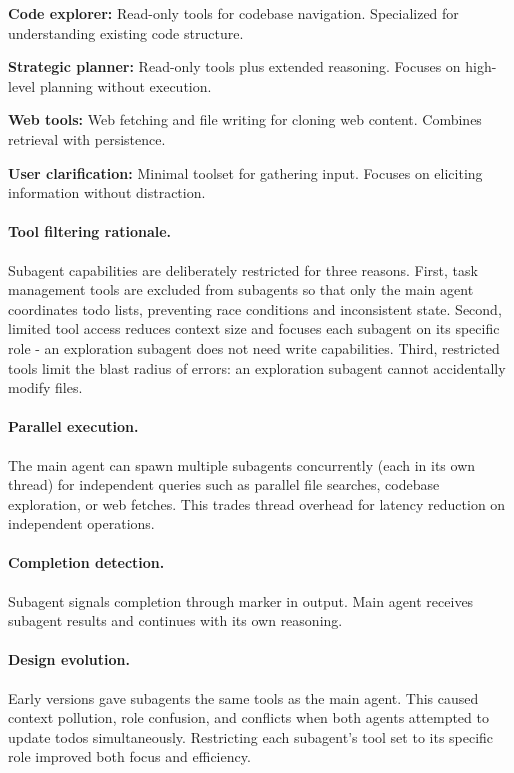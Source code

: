 \begin{packeditemize}
\item \textbf{Code explorer:} Read-only tools for codebase navigation. Specialized for understanding existing code structure.
\item \textbf{Strategic planner:} Read-only tools plus extended reasoning. Focuses on high-level planning without execution.
\item \textbf{Web tools:} Web fetching and file writing for cloning web content. Combines retrieval with persistence.
\item \textbf{User clarification:} Minimal toolset for gathering input. Focuses on eliciting information without distraction.
\end{packeditemize}

\paragraph{Tool filtering rationale.} Subagent capabilities are deliberately restricted for three reasons. First, task management tools are excluded from subagents so that only the main agent coordinates todo lists, preventing race conditions and inconsistent state. Second, limited tool access reduces context size and focuses each subagent on its specific role - an exploration subagent does not need write capabilities. Third, restricted tools limit the blast radius of errors: an exploration subagent cannot accidentally modify files.

\paragraph{Parallel execution.} The main agent can spawn multiple subagents concurrently (each in its own thread) for independent queries such as parallel file searches, codebase exploration, or web fetches. This trades thread overhead for latency reduction on independent operations.

\paragraph{Completion detection.} Subagent signals completion through marker in output. Main agent receives subagent results and continues with its own reasoning.

\paragraph{Design evolution.} Early versions gave subagents the same tools as the main agent. This caused context pollution, role confusion, and conflicts when both agents attempted to update todos simultaneously. Restricting each subagent's tool set to its specific role improved both focus and efficiency.


